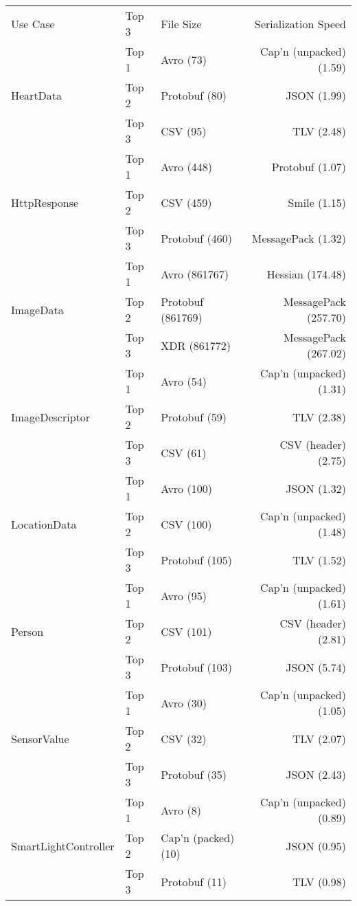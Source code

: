 \begin{tabular}{lllr}
    Use Case & Top 3 & File Size & Serialization Speed \\
    \multirow{3}{*}{HeartData} 
        & Top 1 & Avro (73) & Cap'n (unpacked) (1.59) \\
        & Top 2 & Protobuf (80) & JSON (1.99) \\
        & Top 3 & CSV (95) & TLV (2.48) \\
    \multirow{3}{*}{HttpResponse} 
        & Top 1 & Avro (448) & Protobuf (1.07) \\
        & Top 2 & CSV (459) & Smile (1.15) \\
        & Top 3 & Protobuf (460) & MessagePack (1.32) \\
    \multirow{3}{*}{ImageData} 
        & Top 1 & Avro (861767) & Hessian (174.48) \\
        & Top 2 & Protobuf (861769) & MessagePack (257.70) \\
        & Top 3 & XDR (861772) & MessagePack (267.02) \\
    \multirow{3}{*}{ImageDescriptor} 
        & Top 1 & Avro (54) & Cap'n (unpacked) (1.31) \\
        & Top 2 & Protobuf (59) & TLV (2.38) \\
        & Top 3 & CSV (61) & CSV (header) (2.75) \\
    \multirow{3}{*}{LocationData} 
        & Top 1 & Avro (100) & JSON (1.32) \\
        & Top 2 & CSV (100) &  Cap'n (unpacked) (1.48) \\
        & Top 3 & Protobuf (105) & TLV (1.52) \\
    \multirow{3}{*}{Person} 
        & Top 1 & Avro (95) & Cap'n (unpacked) (1.61) \\
        & Top 2 & CSV (101) &  CSV (header) (2.81) \\
        & Top 3 & Protobuf (103) & JSON (5.74) \\
    \multirow{3}{*}{SensorValue} 
        & Top 1 & Avro (30) & Cap'n (unpacked) (1.05) \\
        & Top 2 & CSV (32) &  TLV (2.07) \\
        & Top 3 & Protobuf (35) & JSON (2.43) \\
    \multirow{3}{*}{SmartLightController} 
        & Top 1 & Avro (8) & Cap'n (unpacked) (0.89) \\
        & Top 2 & Cap'n (packed) (10) & JSON (0.95) \\
        & Top 3 & Protobuf (11) & TLV (0.98) \\
    \end{tabular}
    